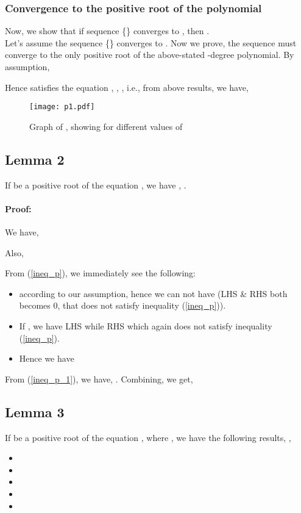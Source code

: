 \documentclass{ijcsa}
\begin{document}
\subsubsection*{Convergence to the positive root of the polynomial}
Now, we show that if sequence \{\} converges to , then . \\

Let's assume the sequence \{\} converges to . Now we prove, the sequence must converge to the only positive root  of the above-stated -degree polynomial. By assumption,


Hence  satisfies the equation , , , i.e.,
from above results, we have, 

\begin{figure}[htbp]
	\label{fig:f1}
	\centering
		\texttt{[image: p1.pdf]}
	\caption{Graph of , showing  for different values of }
\end{figure}

\subsection{Lemma 2}
\label{sec:Lemma2}
\par If  be a positive root of the equation , we have ,
.
\paragraph{Proof:}
\label{sec:Proof_2}
We have,

Also,


\par From (\ref{ineq_p}), we immediately see the following:
\begin{itemize}
	\item  according to our assumption, hence we can not have  
				(LHS \& RHS both becomes 0, that does not satisfy inequality (\ref{ineq_p})).
	\item If , we have LHS  while RHS  which again does not satisfy inequality (\ref{ineq_p}).
	\item Hence we have 
\end{itemize}
\par From (\ref{ineq_p_1}), we have, .
Combining, we get, 

\subsection{Lemma 3}
\label{sec:Lemma3}
\par If  be a positive root of the equation , where , we have the following results, ,
\begin{itemize}
\item	
\item	 
\item	
\item	
\item	
\end{itemize}
\end{document}

